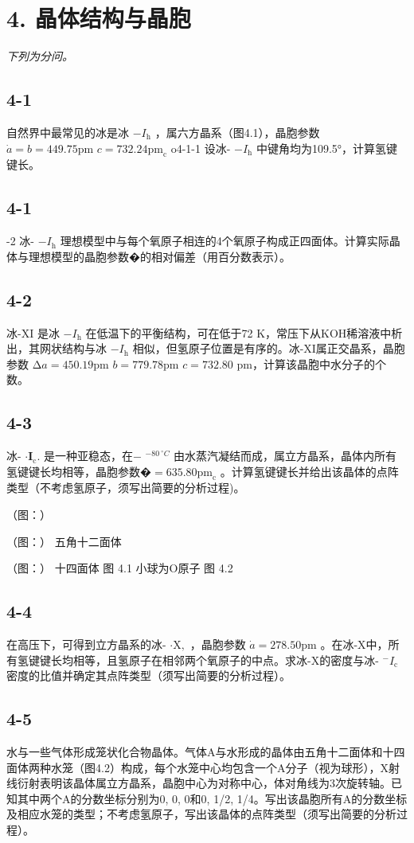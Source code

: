 \section*{4. 晶体结构与晶胞}
\textit{下列为分问。}

\subsection*{4-1}
⾃然界中最常⻅的冰是冰 $- I _ { \mathrm { h } }$ ，属六⽅晶系（图4.1），晶胞参数 $\dot { a } = b = 4 4 9 . 7 5 \mathrm { p m }$ $c = 7 3 2 . 2 4 \mathrm { p m } _ { \mathrm { c } }$ o4-1-1 设冰- $- I _ { \mathrm { h } }$ 中键⻆均为109.5°，计算氢键键⻓。

\subsection*{4-1}
-2 冰- $- I _ { \mathrm { h } }$ 理想模型中与每个氧原⼦相连的4个氧原⼦构成正四⾯体。计算实际晶体与理想模型的晶胞参数�的相对偏差（⽤百分数表⽰）。

\subsection*{4-2}
冰-XI 是冰 $- I _ { \mathrm { h } }$ 在低温下的平衡结构，可在低于72 K，常压下从KOH稀溶液中析出，其⽹状结构与冰 $- I _ { \mathrm { h } }$ 相似，但氢原⼦位置是有序的。冰-XI属正交晶系，晶胞参数 $\mathrm { \Delta } a = 4 5 0 . 1 9 \mathrm { p m }$ $b = 7 7 9 . 7 8 \mathrm { p m }$ $c = 7 3 2 . 8 0$ pm，计算该晶胞中⽔分⼦的个数。

\subsection*{4-3}
冰- $\boldsymbol { \cdot } \boldsymbol { I } _ { \mathrm { c } } .$ 是⼀种亚稳态，在− $^ { - 8 0 ~ ^ { \circ } C }$ 由⽔蒸汽凝结⽽成，属⽴⽅晶系，晶体内所有氢键键⻓均相等，晶胞参数�$= 6 3 5 . 8 0 \mathrm { p m } _ { \mathrm { c } }$ 。计算氢键键⻓并给出该晶体的点阵类型（不考虑氢原⼦，须写出简要的分析过程)。

（图：）

（图：）
五⻆⼗⼆⾯体

（图：）
⼗四⾯体
图 4.1 ⼩球为O原⼦
图 4.2

\subsection*{4-4}
在⾼压下，可得到⽴⽅晶系的冰- $\cdot \mathrm { X } ,$ ，晶胞参数 $\dot { a } = 2 7 8 . 5 0 \mathrm { p m }$ 。在冰-X中，所有氢键键⻓均相等，且氢原⼦在相邻两个氧原⼦的中点。求冰-X的密度与冰- ${ } ^ { - } I _ { \mathrm { c } }$ 密度的⽐值并确定其点阵类型（须写出简要的分析过程）。

\subsection*{4-5}
⽔与⼀些⽓体形成笼状化合物晶体。⽓体A与⽔形成的晶体由五⻆⼗⼆⾯体和⼗四⾯体两种⽔笼（图4.2）构成，每个⽔笼中⼼均包含⼀个A分⼦（视为球形），X射线衍射表明该晶体属⽴⽅晶系，晶胞中⼼为对称中⼼，体对⻆线为3次旋转轴。已知其中两个A的分数坐标分别为0, 0, 0和0, 1/2, 1/4。写出该晶胞所有A的分数坐标及相应⽔笼的类型；不考虑氢原⼦，写出该晶体的点阵类型（须写出简要的分析过程）。
